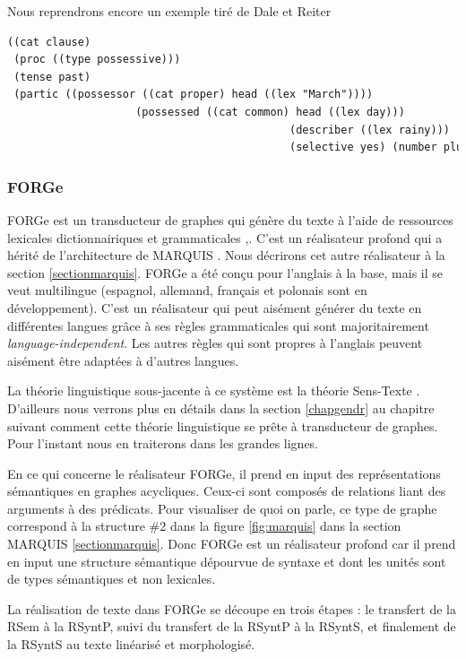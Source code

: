Nous reprendrons encore un exemple tiré de Dale et Reiter \cite{ReiterBuildingNaturalLanguage2000} 
\begin{lstlisting}[language=Xml, caption=FD: input de Surge, label=surge]
((cat clause)
 (proc ((type possessive)))
 (tense past)
 (partic ((possessor ((cat proper) head ((lex "March"))))
					(possessed ((cat common) head ((lex day)))
											(describer ((lex rainy)))
											(selective yes) (number plural)))))
\end{lstlisting}

\subsubsection{FORGe}
FORGe est un transducteur de graphes qui génère du texte à l'aide de ressources lexicales dictionnairiques et grammaticales \citep{MilledemoFORGePompeu2017},\citep{DBLP:conf/semeval/MilleCBW17}. C'est un réalisateur profond qui a hérité de l'architecture de MARQUIS \citep{WannerMARQUISGENERATIONUSERTAILORED2010}. Nous décrirons cet autre réalisateur à la section \ref{sectionmarquis}. FORGe a été conçu pour l'anglais à la base, mais il se veut multilingue (espagnol, allemand, français et polonais sont en développement). C'est un réalisateur qui peut aisément générer du texte en différentes langues grâce à ses règles grammaticales qui sont majoritairement \emph{language-independent}. Les autres règles qui sont propres à l'anglais peuvent aisément être adaptées à d'autres langues.

La théorie linguistique sous-jacente à ce système est la théorie Sens-Texte . D'ailleurs nous verrons plus en détails dans la section \ref{chapgendr} au chapitre suivant comment cette théorie linguistique se prête à transducteur de graphes. Pour l'instant nous en traiterons dans les grandes lignes.

En ce qui concerne le réalisateur FORGe, il prend en input des représentations sémantiques en graphes acycliques. Ceux-ci sont composés de relations liant des arguments à des prédicats. Pour visualiser de quoi on parle, ce type de graphe correspond à la structure \#2 dans la figure \ref{fig:marquis} dans la section MARQUIS \ref{sectionmarquis}. Donc FORGe est un réalisateur profond car il prend en input une structure sémantique dépourvue de syntaxe et dont les unités sont de types sémantiques et non lexicales.

La réalisation de texte dans FORGe se découpe en trois étapes : le transfert de la RSem à la RSyntP, suivi du transfert de la RSyntP à la RSyntS, et finalement de la RSyntS au texte linéarisé et morphologisé. 

